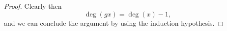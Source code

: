 \documentclass[11pt]{article}
\theoremstyle{plain}
\theoremstyle{nonumberplain}
\theoremstyle{plain}
\newtheorem{definition}[lemma]{Definition}
\numberwithin{equation}{section}
\theoremstyle{nonumberplain}
\newtheorem{proof}{Proof}
\newcommand\cF{{\mathcal F}}
\newcommand\1{{\bf 1}}
\begin{document}
\begin{proof}
  Clearly then
  \begin{equation*}
    \deg(gx) = \deg(x)-1,
  \end{equation*}
  and we can conclude the argument by using the induction hypothesis.
\end{proof}


\end{document}
